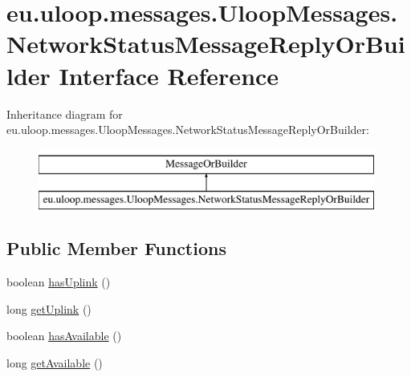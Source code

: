 \hypertarget{interfaceeu_1_1uloop_1_1messages_1_1UloopMessages_1_1NetworkStatusMessageReplyOrBuilder}{\section{eu.\+uloop.\+messages.\+Uloop\+Messages.\+Network\+Status\+Message\+Reply\+Or\+Builder Interface Reference}
\label{interfaceeu_1_1uloop_1_1messages_1_1UloopMessages_1_1NetworkStatusMessageReplyOrBuilder}
}
Inheritance diagram for eu.\+uloop.\+messages.\+Uloop\+Messages.\+Network\+Status\+Message\+Reply\+Or\+Builder\+:\begin{figure}[H]
\begin{center}
\leavevmode
\includegraphics[height=2.000000cm]{interfaceeu_1_1uloop_1_1messages_1_1UloopMessages_1_1NetworkStatusMessageReplyOrBuilder}
\end{center}
\end{figure}
\subsection*{Public Member Functions}
\begin{DoxyCompactItemize}
\item 
boolean \hyperlink{interfaceeu_1_1uloop_1_1messages_1_1UloopMessages_1_1NetworkStatusMessageReplyOrBuilder_a0509c8ec0f76840337cb8b7ee5f2595b}{has\+Uplink} ()
\item 
long \hyperlink{interfaceeu_1_1uloop_1_1messages_1_1UloopMessages_1_1NetworkStatusMessageReplyOrBuilder_a556bcbf86c58885d8e1c48fc5173f3ff}{get\+Uplink} ()
\item 
boolean \hyperlink{interfaceeu_1_1uloop_1_1messages_1_1UloopMessages_1_1NetworkStatusMessageReplyOrBuilder_a204ce529f1f0f41b246fea62d5f993ab}{has\+Available} ()
\item 
long \hyperlink{interfaceeu_1_1uloop_1_1messages_1_1UloopMessages_1_1NetworkStatusMessageReplyOrBuilder_a4059b5bf18655f2f119a0d6c26cec204}{get\+Available} ()
\end{DoxyCompactItemize}


